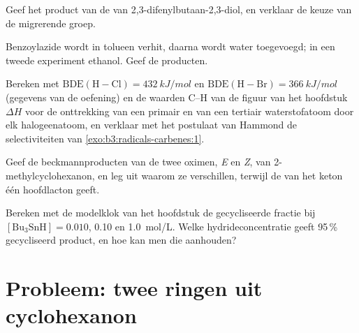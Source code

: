 \begin{exercise}[$\star\star$]\label{exo:b3:radicals-carbenes:8}
Geef het product van de  van 2,3-difenylbutaan-2,3-diol,
en verklaar de keuze van de migrerende groep.
\end{exercise}

\begin{exercise}[$\star\star$]\label{exo:b3:radicals-carbenes:9}
Benzoylazide wordt in tolueen verhit, daarna wordt water toegevoegd; in
een tweede experiment ethanol. Geef de producten.
\end{exercise}

\begin{exercise}[$\star\star\star$]\label{exo:b3:radicals-carbenes:10}
Bereken met $\mathrm{BDE(H{-}Cl)} = \qty{432}{kJ/mol}$ en $\mathrm{BDE(H{-}Br)} = \qty{366}{kJ/mol}$ (gegevens van de oefening) en de waarden C--H van
de figuur van het hoofdstuk $\Delta H$ voor de onttrekking van een primair en
van een tertiair waterstofatoom door elk halogeenatoom, en verklaar met
het postulaat van Hammond de selectiviteiten van
\cref{exo:b3:radicals-carbenes:1}.
\end{exercise}

\begin{exercise}[$\star\star\star$]\label{exo:b3:radicals-carbenes:11}
Geef de beckmannproducten van de twee oximen, \textit{E} en \textit{Z}, van 2-methylcyclohexanon,
en leg uit waarom ze verschillen, terwijl de  van
het keton één hoofdlacton geeft.
\end{exercise}

\begin{exercise}[$\star\star\star$]\label{exo:b3:radicals-carbenes:12}
Bereken met de modelklok van het hoofdstuk de gecycliseerde fractie bij $[\mathrm{Bu_3SnH}] = 0.010$,
0.10 en \qty{1.0}{mol/L}. Welke hydrideconcentratie geeft 95\,\% gecycliseerd product, en hoe
kan men die aanhouden?
\end{exercise}

\section{Probleem: twee ringen uit cyclohexanon}

